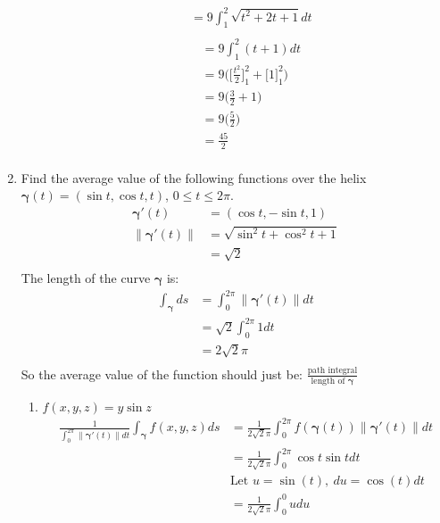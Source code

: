 \documentclass{article}
\newcommand{\norm}[1]{\| #1 \|}
\begin{document}
\begin{enumerate}
\begin{enumerate}
\begin{multicols}{2}
\begin{align*}
        &= 9 \int_1^2 \sqrt{t^2 + 2t +  1} dt \\
    \end{align*}
    \begin{align*} 
        &= 9 \int_1^2 (t + 1) dt \\ 
        &= 9 \Big( \Big[ \frac{t^2}{2} \Big]_1^2 + \Big[1\Big]_1^2 \Big) \\
        &= 9 \Big( \frac{3}{2} + 1 \Big) \\
        &= 9 \Big( \frac{5}{2} \Big) \\
        &= \frac{45}{2} \\
    \end{align*}
    \end{multicols}
\end{enumerate}
\newpage
\item Find the average value of the following functions over the helix $\boldsymbol{\gamma}(t) = (\sin t, \cos t, t)$, $0\leq t \leq 2\pi$.
\begin{align*}
    \boldsymbol{\gamma}'(t) &= ( \cos t, - \sin t, 1) \\
    \norm{\boldsymbol{\gamma}'(t)} &= \sqrt{ \sin^2t + \cos^2t +1} \\ 
    &= \sqrt{2} \\
\end{align*}
The length of the curve $\boldsymbol{\gamma}$ is:
\begin{align*}
    \int_{\boldsymbol{\gamma}} ds &= \int_0^{2\pi} \norm{\boldsymbol{\gamma}'(t)} dt \\
    &= \sqrt{2} \int_0^{2\pi} 1 dt \\
    &= 2\sqrt{2}\pi \\
\end{align*}
So the average value of the function should just be: $\displaystyle \frac{\text{path integral}}{\text{length of }\boldsymbol{\gamma}}$
\begin{enumerate}
    \item $f(x,y,z) = y\sin z$
    \begin{align*} 
        \frac{1}{\int_0^{2\pi} \norm{\boldsymbol{\gamma}'(t)}dt}  \int_{\boldsymbol{\gamma}}f(x,y,z)ds &= \frac{1}{2\sqrt{2}\pi} \int_0^{2\pi} f(\boldsymbol{\gamma}(t)) \norm{\boldsymbol{\gamma}'(t)}dt \\
        &= \frac{1}{2\sqrt{2}\pi} \int_0^{2\pi} \cos t \sin t dt \\
        &\text{Let } u = \sin(t),\: du = \cos(t)dt \\
        &= \frac{1}{2\sqrt{2}\pi} \int_0^0 udu \\

\end{align*}
\end{enumerate}
\end{enumerate}
\end{document}

